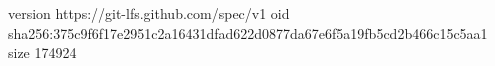 version https://git-lfs.github.com/spec/v1
oid sha256:375c9f6f17e2951c2a16431dfad622d0877da67e6f5a19fb5cd2b466c15c5aa1
size 174924
